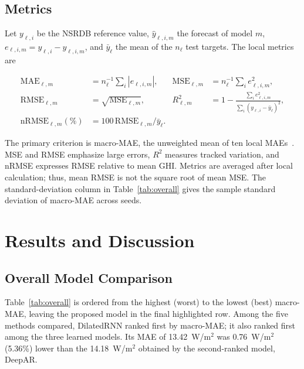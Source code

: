 \documentclass[runningheads]{llncs}
\begin{document}
\subsection{Metrics}

Let $y_{\ell,i}$ be the NSRDB reference value, $\widehat y_{\ell,i,m}$ the forecast of model $m$, $e_{\ell,i,m}=y_{\ell,i}-\widehat y_{\ell,i,m}$, and $\bar y_\ell$ the mean of the $n_\ell$ test targets. The local metrics are

\begin{equation}
\begin{aligned}
 \mathrm{MAE}_{\ell,m}&=n_\ell^{-1}\sum_i|e_{\ell,i,m}|, &
 \mathrm{MSE}_{\ell,m}&=n_\ell^{-1}\sum_i e_{\ell,i,m}^2,\\
 \mathrm{RMSE}_{\ell,m}&=\sqrt{\mathrm{MSE}_{\ell,m}}, &
 R^2_{\ell,m}&=1-\frac{\sum_i e_{\ell,i,m}^2}{\sum_i(y_{\ell,i}-\bar y_\ell)^2},\\
 \mathrm{nRMSE}_{\ell,m}(\%)&=100\,\mathrm{RMSE}_{\ell,m}/\bar y_\ell. &&
\end{aligned}
\label{eq:metrics}
\end{equation}

The primary criterion is macro-MAE, the unweighted mean of ten local MAEs~\cite{hyndman2006}. MSE and RMSE emphasize large errors, $R^2$ measures tracked variation, and nRMSE expresses RMSE relative to mean GHI. Metrics are averaged after local calculation; thus, mean RMSE is not the square root of mean MSE. The standard-deviation column in Table~\ref{tab:overall} gives the sample standard deviation of macro-MAE across seeds.

\section{Results and Discussion}
\label{sec:results}

\subsection{Overall Model Comparison}

Table~\ref{tab:overall} is ordered from the highest (worst) to the lowest (best) macro-MAE, leaving the proposed model in the final highlighted row. Among the five methods compared, DilatedRNN ranked first by macro-MAE; it also ranked first among the three learned models. Its MAE of 13.42~W/m$^2$ was 0.76~W/m$^2$ (5.36\%) lower than the 14.18~W/m$^2$ obtained by the second-ranked model, DeepAR.
\end{document}
